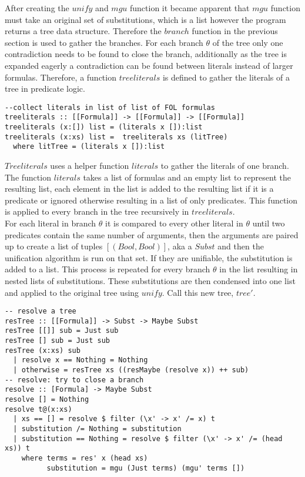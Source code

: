 \documentclass{article}%
\begin{document}
After creating the $unify$ and $mgu$ function it became apparent that $mgu$ function must take an original set of substitutions, which is a list however the program returns a tree data structure. Therefore the $branch$ function in the previous section is used to gather the branches. For each branch $\theta$ of the tree only one contradiction needs to be found to close the branch, additionally as the tree is expanded eagerly a contradiction can be found between literals instead of larger formulas. Therefore, a function $treeliterals$ is defined to gather the literals of a tree in predicate logic. 
\begin{verbatim}
--collect literals in list of list of FOL formulas
treeliterals :: [[Formula]] -> [[Formula]] -> [[Formula]]
treeliterals (x:[]) list = (literals x []):list
treeliterals (x:xs) list =  treeliterals xs (litTree)
  where litTree = (literals x []):list
\end{verbatim}
$Treeliterals$ uses a helper function $literals$ to gather the literals of one branch. The function $literals$ takes a list of formulas and an empty list to represent the resulting list, each element in the list is added to the resulting list if it is a predicate or ignored otherwise resulting in a list of only predicates. This function is applied to every branch in the tree recursively in $treeliterals$.\\
For each literal in branch $\theta$ it is compared to every other literal in $\theta$ until two predicates contain the same number of arguments, then the arguments are paired up to create a list of tuples $[(Bool, Bool)]$, aka a $Subst$ and then the unification algorithm is run on that set. If they are unifiable, the substitution is added to a list. This process is repeated for every branch $\theta$ in the list resulting in nested lists of substitutions. These substitutions are then condensed into one list and applied to the original tree using $unify$. Call this new tree, $tree'$.
\begin{verbatim}
-- resolve a tree
resTree :: [[Formula]] -> Subst -> Maybe Subst 
resTree [[]] sub = Just sub
resTree [] sub = Just sub 
resTree (x:xs) sub
  | resolve x == Nothing = Nothing 
  | otherwise = resTree xs ((resMaybe (resolve x)) ++ sub)
-- resolve: try to close a branch 
resolve :: [Formula] -> Maybe Subst
resolve [] = Nothing
resolve t@(x:xs) 
  | xs == [] = resolve $ filter (\x' -> x' /= x) t
  | substitution /= Nothing = substitution
  | substitution == Nothing = resolve $ filter (\x' -> x' /= (head xs)) t
    where terms = res' x (head xs)
          substitution = mgu (Just terms) (mgu' terms [])
\end{verbatim}
\end{document}
